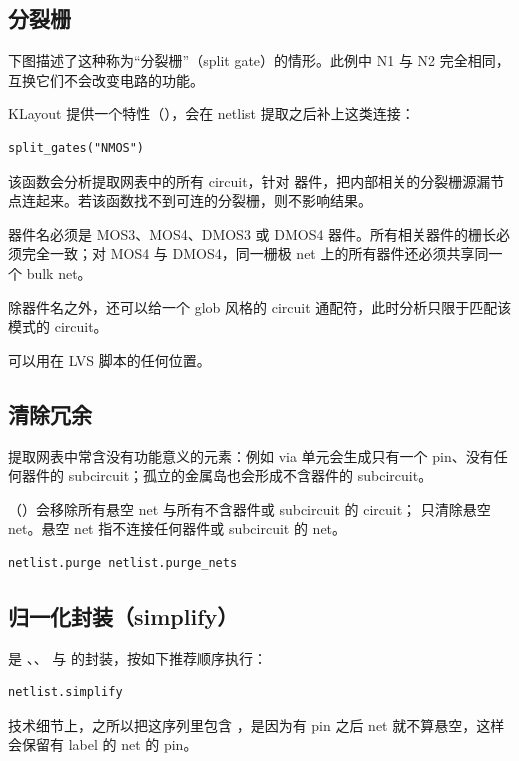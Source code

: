 \subsection{分裂栅}

下图描述了这种称为“分裂栅”（split gate）的情形。此例中 N1 与 N2 完全相同，互换它们不会改变电路的功能。


KLayout 提供一个特性（），会在 netlist 提取之后补上这类连接：

\begin{lstlisting}
split_gates("NMOS")
\end{lstlisting}

该函数会分析提取网表中的所有 circuit，针对  器件，把内部相关的分裂栅源漏节点连起来。若该函数找不到可连的分裂栅，则不影响结果。

器件名必须是 MOS3、MOS4、DMOS3 或 DMOS4 器件。所有相关器件的栅长必须完全一致；对 MOS4 与 DMOS4，同一栅极 net 上的所有器件还必须共享同一个 bulk net。

除器件名之外，还可以给一个 glob 风格的 circuit 通配符，此时分析只限于匹配该模式的 circuit。

 可以用在 LVS 脚本的任何位置。

\subsection{清除冗余}

提取网表中常含没有功能意义的元素：例如 via 单元会生成只有一个 pin、没有任何器件的 subcircuit；孤立的金属岛也会形成不含器件的 subcircuit。

（）会移除所有悬空 net 与所有不含器件或 subcircuit 的 circuit； 只清除悬空 net。悬空 net 指不连接任何器件或 subcircuit 的 net。

\begin{lstlisting}
netlist.purge netlist.purge_nets
\end{lstlisting}

\subsection{归一化封装（simplify）}

 是 、、 与  的封装，按如下推荐顺序执行：

\begin{lstlisting}
netlist.simplify
\end{lstlisting}

技术细节上，之所以把这序列里包含 ，是因为有 pin 之后 net 就不算悬空，这样  会保留有 label 的 net 的 pin。
